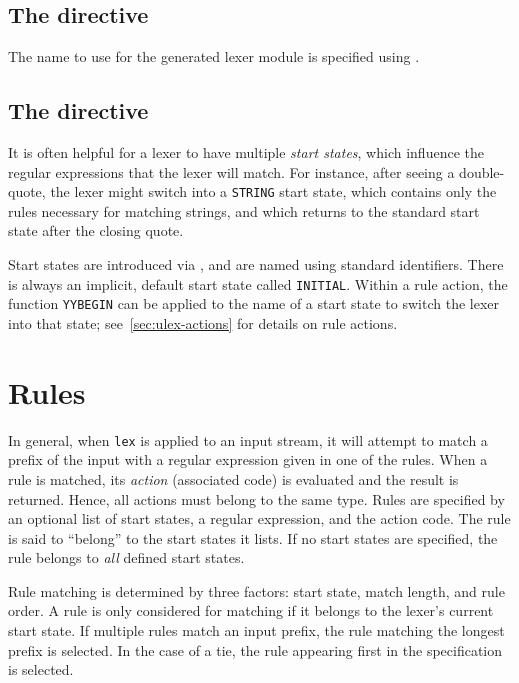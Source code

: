 \subsection{The  directive}

The name to use for the generated lexer module is specified using .

\subsection{The  directive}
\label{sec:start-states}

It is often helpful for a lexer to have multiple \emph{start states}, which influence the regular expressions that the lexer will match.  For instance, after seeing a double-quote, the lexer might switch into a \texttt{STRING} start state, which contains only the rules necessary for matching strings, and which returns to the standard start state after the closing quote.

Start states are introduced via , and are named using standard identifiers.  There is always an implicit, default start state called \texttt{INITIAL}.  Within a rule action, the function \texttt{YYBEGIN} can be applied to the name of a start state to switch the lexer into that state; see~\ref{sec:ulex-actions} for details on rule actions.

\section{Rules}\label{sec:ulex-rules}

In general, when \texttt{lex} is applied to an input stream, it will attempt to match a prefix of the input with a regular expression given in one of the rules.  When a rule is matched, its \emph{action} (associated code) is evaluated and the result is returned.  Hence, all actions must belong to the same type.%
Rules are specified by an optional list of start states, a regular expression, and the action code.  The rule is said to ``belong'' to the start states it lists.  If no start states are specified, the rule belongs to \emph{all} defined start states.

Rule matching is determined by three factors: start state, match length, and rule order.  A rule is only considered for matching if it belongs to the lexer's current start state.  If multiple rules match an input prefix, the rule matching the longest prefix is selected.  In the case of a tie, the rule appearing first in the specification is selected.

